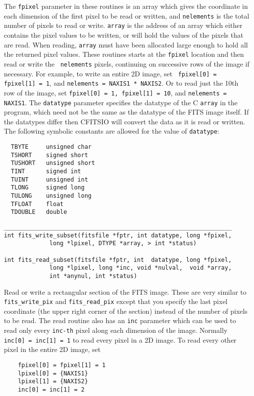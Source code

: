 \documentclass[11pt]{article}
\begin{document}
The {\tt fpixel} parameter in these routines is an array which gives
the coordinate in each dimension of the first pixel to be read or
written, and {\tt nelements} is the total number of pixels to read or
write.  {\tt array} is the address of an array which either contains
the pixel values to be written, or will hold the values of the pixels
that are read.  When reading, {\tt array} must have been allocated
large enough to hold all the returned pixel values.  These routines
starts at the {\tt fpixel} location and then read or write the {\tt
nelements} pixels, continuing on successive rows of the image if
necessary.  For example, to write an entire 2D image, set {\tt
fpixel[0] = fpixel[1] = 1}, and {\tt nelements = NAXIS1 * NAXIS2}.  Or
to read just the 10th row of the image, set {\tt fpixel[0] = 1,
fpixel[1] = 10}, and {\tt nelements = NAXIS1}.  The {\tt datatype}
parameter specifies the datatype of the C {\tt array} in the program,
which need not be the same as the datatype of the FITS image itself.
If the datatypes differ then CFITSIO will convert the data as it is
read or written.  The following symbolic constants are allowed for the
value of {\tt datatype}:
\begin{verbatim}
  TBYTE     unsigned char
  TSHORT    signed short
  TUSHORT   unsigned short
  TINT      signed int
  TUINT     unsigned int
  TLONG     signed long
  TULONG    unsigned long
  TFLOAT    float
  TDOUBLE   double
\end{verbatim}


\begin{verbatim}
_________________________________________________________________
int fits_write_subset(fitsfile *fptr, int datatype, long *fpixel,
             long *lpixel, DTYPE *array, > int *status)

int fits_read_subset(fitsfile *fptr, int  datatype, long *fpixel,
             long *lpixel, long *inc, void *nulval,  void *array,
             int *anynul, int *status)
\end{verbatim}

Read or write a rectangular section of the FITS image.  These are very
similar to {\tt fits\_write\_pix} and {\tt fits\_read\_pix} except that
you specify the last pixel coordinate (the upper right corner of the
section) instead of the number of pixels to be read.  The read routine
also has an {\tt inc} parameter which can be used to read only every
{\tt inc-th} pixel along each dimension of the image.  Normally  {\tt
inc[0] = inc[1] = 1} to read every pixel in a 2D image.  To read every
other pixel in the entire 2D image, set
\begin{verbatim}
    fpixel[0] = fpixel[1] = 1
    lpixel[0] = {NAXIS1}
    lpixel[1] = {NAXIS2}  
    inc[0] = inc[1] = 2  
\end{verbatim}
\end{document}
